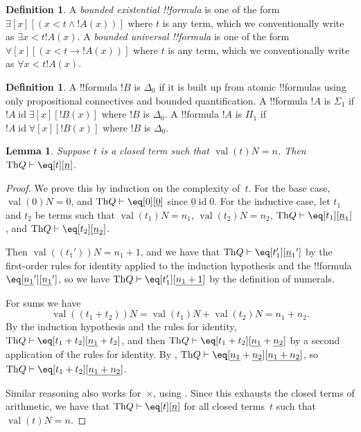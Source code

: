 \documentclass[10pt,a4paper]{article}
\makeatletter
\theoremstyle{plain}
\newtheorem{lem}[thm]{Lemma}
\theoremstyle{definition}
\newtheorem{defn}[thm]{Definition}
\theoremstyle{remark}
\newcommand*{\ollabel}[1]{\label{#1}}
\newcommand{\olref}{\@ifnextchar[{\olref@i}{\olref@final}}
\def\olref@i[#1]{\@ifnextchar[{\olref@ii}{\olref@final}}
\def\olref@ii[#1]{\@ifnextchar[{\olref@iii}{\olref@final}}
\def\olref@iii[#1]{\olref@final}
\def\olref@final#1{\ref{#1}}
\providecommand{\lif}{\mathbin{\rightarrow}}
\providecommand{\lforall}{\mathord{\forall}}
\providecommand{\lexists}{\mathord{\exists}}
\providecommand{\Proves}{\mathrel{\vdash}}
\providecommand{\Obj}{}
\providecommand{\Th}{\ensuremath{\mathrm{Th}}}
\providecommand{\num}[1]{\underline{#1}}
\providecommand{\Value}[1]{\operatorname{val}(#1)}
\providecommand{\bforall}{\forall}
\providecommand{\bexists}{\exists}
\providecommand{\ident}{\operatorname{id}}
\makeatother
\begin{document}
\begin{defn}
\ollabel{defn:bd-quant}
A \emph{bounded existential !!{formula}} is one of the form
$\lexists[x][(x < t \land !A(x))]$ where $t$ is any term, which we
conventionally write as $\bexists{x < t}{!A(x)}$.
%
A \emph{bounded universal !!{formula}} is one of the form
$\lforall[x][(x < t \lif !A(x))]$ where $t$ is any term, which we
conventionally write as $\bforall{x < t}{!A(x)}$.
\end{defn}

\begin{defn}
\ollabel{defn:delta0-sigma1-pi1-frm}
A !!{formula} $!B$ is $\Delta_0$ if it is built up from atomic
!!{formula}s using only propositional connectives and bounded
quantification.
%
A !!{formula} $!A$ is $\Sigma_1$ if $!A \ident \lexists[x][!B(x)]$
where $!B$ is $\Delta_0$.
%
A !!{formula} $!A$ is $\Pi_1$ if $!A \ident \lforall[x][!B(x)]$
where $!B$ is $\Delta_0$.
\end{defn}

\begin{lem}
\ollabel{lem:q-proves-clterm-id} Suppose $t$ is a closed term such that
$\Value{t}{N} = n$. Then $\Th{Q} \Proves \eq[t][\num n]$.
\end{lem}

\begin{proof}
We prove this by induction on the complexity of~$t$. For the base case,
$\Value{\Obj 0}{N} = 0$, and $\Th{Q} \Proves \eq[\Obj 0][\num 0]$
since $\num 0 \ident \Obj 0$.
%
For the inductive case, let $t_1$ and $t_2$ be terms such that
$\Value{t_1}{N} = n_1$, $\Value{t_2}{N} = n_2$,
$\Th{Q} \Proves \eq[t_1][\num n_1]$, and
$\Th{Q} \Proves \eq[t_2][\num n_2]$.

Then $\Value{(t_1')}{N} = n_1 + 1$, and we have that $\Th{Q} \Proves
\eq[t_1'][{\num n_1}']$ by the first-order rules for identity applied
to the induction hypothesis and the !!{formula}
$\eq[\num{n_1}'][\num{n_1}']$,
so we have $\Th{Q} \Proves \eq[t_1'][\num{n_1 + 1}]$
by the definition of numerals.

For sums we have
\[
      \Value{(t_1 + t_2)}{N}
    = \Value{t_1}{N} + \Value{t_2}{N}
    = n_1 + n_2.
\]
By the induction hypothesis and the rules for identity,
$\Th{Q} \Proves \eq[t_1 + t_2][\num{n_1} + t_2]$, and then
$\Th{Q} \Proves \eq[t_1 + t_2][\num{n_1} + \num{n_2}]$
by a second application of the rules for identity.
By \olref[inc][req][bre]{lem:q-proves-add},
$\Th{Q} \Proves \eq[\num{n_1} + \num{n_2}][\num{n_1 + n_2}]$,
so $\Th{Q} \Proves \eq[t_1 + t_2][\num{n_1 + n_2}]$.

Similar reasoning also works for~$\times$, using
\olref[inc][req][bre]{lem:q-proves-mult}.
%
Since this exhausts the closed terms of arithmetic, we have that
$\Th{Q} \Proves \eq[t][\num n]$ for all closed terms~$t$ such that
$\Value{t}{N} = n$.
\end{proof}
\end{document}
